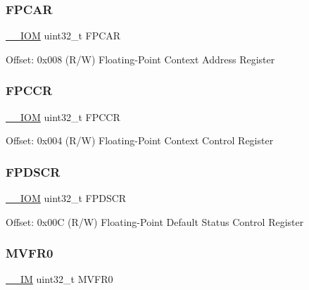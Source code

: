 \subsubsection{\texorpdfstring{F\+P\+C\+AR}{FPCAR}}
{\footnotesize\ttfamily \mbox{\hyperlink{core__cm4_8h_ab6caba5853a60a17e8e04499b52bf691}{\+\_\+\+\_\+\+I\+OM}} uint32\+\_\+t F\+P\+C\+AR}

Offset\+: 0x008 (R/W) Floating-\/\+Point Context Address Register \mbox{\label{struct_f_p_u___type_a242040bad11980d6250848a44cc967e3}} 
\subsubsection{\texorpdfstring{F\+P\+C\+CR}{FPCCR}}
{\footnotesize\ttfamily \mbox{\hyperlink{core__cm4_8h_ab6caba5853a60a17e8e04499b52bf691}{\+\_\+\+\_\+\+I\+OM}} uint32\+\_\+t F\+P\+C\+CR}

Offset\+: 0x004 (R/W) Floating-\/\+Point Context Control Register \mbox{\label{struct_f_p_u___type_a05a8c9a999e6ca4ff19f30c93ec50217}} 
\subsubsection{\texorpdfstring{F\+P\+D\+S\+CR}{FPDSCR}}
{\footnotesize\ttfamily \mbox{\hyperlink{core__cm4_8h_ab6caba5853a60a17e8e04499b52bf691}{\+\_\+\+\_\+\+I\+OM}} uint32\+\_\+t F\+P\+D\+S\+CR}

Offset\+: 0x00C (R/W) Floating-\/\+Point Default Status Control Register \mbox{\label{struct_f_p_u___type_a9b0103b438c8922eaea5624f71afbbc8}} 
\subsubsection{\texorpdfstring{M\+V\+F\+R0}{MVFR0}}
{\footnotesize\ttfamily \mbox{\hyperlink{core__cm4_8h_a4cc1649793116d7c2d8afce7a4ffce43}{\+\_\+\+\_\+\+IM}} uint32\+\_\+t M\+V\+F\+R0}

